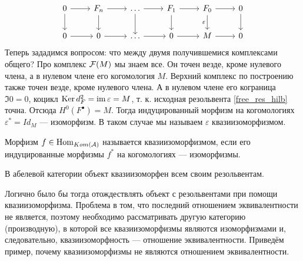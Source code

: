 \documentclass[../main.tex]{subfiles}
\begin{document}
\begin{equation*}
    \begin{tikzcd}
	0 & {F_{n}} & \ldots & {F_1} & {F_0} & 0 \\
	0 & 0 & \ldots & 0 & M & 0
	\arrow[from=1-6, to=2-6]
	\arrow["\varepsilon"', from=1-5, to=2-5]
	\arrow[from=1-4, to=2-4]
	\arrow[from=1-3, to=2-3]
	\arrow[from=1-2, to=2-2]
	\arrow[from=1-1, to=2-1]
	\arrow[from=1-1, to=1-2]
	\arrow[from=1-2, to=1-3]
	\arrow[from=1-3, to=1-4]
	\arrow[from=1-4, to=1-5]
	\arrow[from=1-5, to=1-6]
	\arrow[from=2-5, to=2-6]
	\arrow[from=2-4, to=2-5]
	\arrow[from=2-3, to=2-4]
	\arrow[from=2-2, to=2-3]
	\arrow[from=2-1, to=2-2]
\end{tikzcd}
\end{equation*}
Теперь зададимся вопросом: что между двумя получившемися комплексами общего? Про комплекс $\mathcal{F}(M)$ мы знаем все. Он точен везде, кроме нулевого члена, а в нулевом члене его когомология $M$. Верхний комплекс по построению также точен везде, кроме нулевого члена. А в нулевом члене его кограница $\Im 0 = 0$, коцикл $\mathop{\mathrm{Ker}}\nolimits d^2_F = \mathop{\mathrm{im}}\nolimits \varepsilon = M$, т. к. исходная резольвента \eqref{free_res_hilb} точна. Отсюда $H^0(F^\bullet) = M$. Тогда индуцированный морфизм на когомологиях $\varepsilon^* = Id_M$ --- изоморфизм. В таком случае мы называем $\varepsilon$ квазиизоморфизмом.
\begin{to_def}
Морфизм $f\in \operatorname{Hom}_{Kom(\mathcal{A})}$ называется квазиизоморфизмом, если его индуцированные морфизмы $f^*$ на когомологиях --- изоморфизмы.
\end{to_def}
\begin{to_suj}\label{obj_res_eq}
В абелевой категории объект квазиизоморфен всем своим резольвентам.
\end{to_suj}
Логично было бы тогда отождествлять объект с резольвентами при помощи квазиизоморфизма. Проблема в том, что последний отношением эквивалентности не является, поэтому необходимо рассматривать другую категорию (производную), в которой все квазиизоморфизмы являются изоморфизмами и, следовательно, квазиизоморфность --- отношение эквивалентности.
Приведём пример, почему квазиизоморфизмы не являются отношением эквивалентности.
\end{document}
